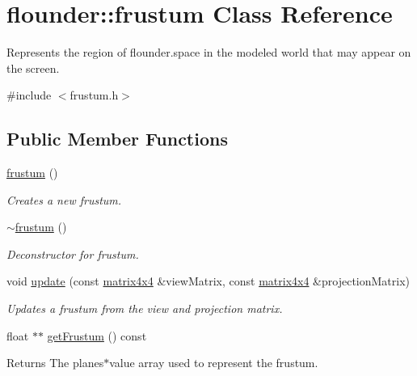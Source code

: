 \hypertarget{classflounder_1_1frustum}{}\section{flounder\+:\+:frustum Class Reference}
\label{classflounder_1_1frustum}


Represents the region of flounder.\+space in the modeled world that may appear on the screen.  




{\ttfamily \#include $<$frustum.\+h$>$}

\subsection*{Public Member Functions}
\begin{DoxyCompactItemize}
\item 
\hyperlink{classflounder_1_1frustum_a35fc0f2d80ba8f057abf39dadabb5a45}{frustum} ()
\begin{DoxyCompactList}\small\item\em Creates a new frustum. \end{DoxyCompactList}\item 
\hyperlink{classflounder_1_1frustum_a4496169c4a40c7d68447a3d1197e7fb4}{$\sim$frustum} ()
\begin{DoxyCompactList}\small\item\em Deconstructor for frustum. \end{DoxyCompactList}\item 
void \hyperlink{classflounder_1_1frustum_a02691e8f1da2d158915f6e267768153d}{update} (const \hyperlink{classflounder_1_1matrix4x4}{matrix4x4} \&view\+Matrix, const \hyperlink{classflounder_1_1matrix4x4}{matrix4x4} \&projection\+Matrix)
\begin{DoxyCompactList}\small\item\em Updates a frustum from the view and projection matrix. \end{DoxyCompactList}\item 
\mbox{\label{classflounder_1_1frustum_af529ca96b9da6e9f417a50465f80fb5d}} 
float $\ast$$\ast$ \hyperlink{classflounder_1_1frustum_af529ca96b9da6e9f417a50465f80fb5d}{get\+Frustum} () const
\begin{DoxyCompactList}\small\item\em \begin{DoxyReturn}{Returns}
The planes$\ast$value array used to represent the frustum. 

\end{DoxyReturn}
\end{DoxyCompactList}$$
\end{DoxyCompactItemize}
